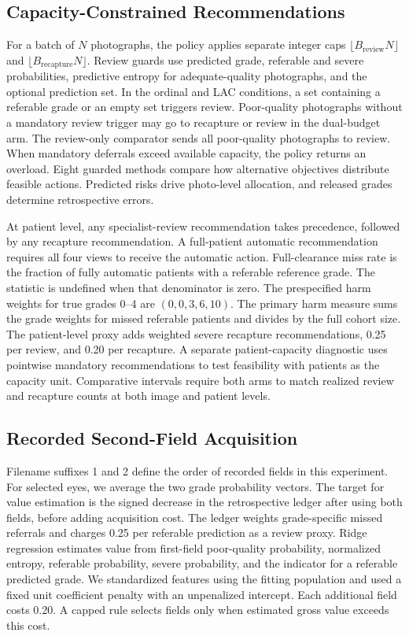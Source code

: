 \documentclass[conference]{IEEEtran}
\begin{document}
\subsection{Capacity-Constrained Recommendations}
For a batch of $N$ photographs, the policy applies separate integer caps
$\lfloor B_{\mathrm{review}}N\rfloor$ and
$\lfloor B_{\mathrm{recapture}}N\rfloor$. Review guards use predicted grade,
referable and severe probabilities, predictive entropy for adequate-quality
photographs, and the optional prediction set. In the ordinal and LAC
conditions, a set containing a referable grade or an empty set triggers
review. Poor-quality photographs without a mandatory review trigger may go to
recapture or review in the dual-budget arm. The review-only comparator sends
all poor-quality photographs to review. When mandatory deferrals exceed
available capacity, the policy returns an overload. Eight guarded methods
compare how alternative objectives distribute feasible actions. Predicted
risks drive photo-level allocation, and released grades determine retrospective
errors.

At patient level, any specialist-review recommendation takes precedence,
followed by any recapture recommendation. A full-patient automatic
recommendation requires all four views to receive the automatic action.
Full-clearance miss rate is the fraction of fully automatic patients with a
referable reference grade. The statistic is undefined when that denominator
is zero. The prespecified harm weights for true grades 0--4 are
$(0,0,3,6,10)$. The primary harm measure sums the grade weights for missed
referable patients and divides by the full cohort size. The patient-level
proxy adds weighted severe recapture recommendations, 0.25 per review, and
0.20 per recapture. A separate patient-capacity diagnostic uses pointwise
mandatory recommendations to test feasibility with patients as the capacity
unit. Comparative intervals require both arms to match realized review and
recapture counts at both image and patient levels.

\subsection{Recorded Second-Field Acquisition}
Filename suffixes 1 and 2 define the order of recorded fields in this
experiment. For selected eyes, we average the two grade probability vectors.
The target for value estimation is the signed decrease in the retrospective
ledger after using both fields, before adding acquisition cost. The ledger
weights grade-specific missed referrals and charges 0.25 per referable
prediction as a review proxy. Ridge regression estimates value from first-field
poor-quality probability, normalized entropy, referable probability, severe
probability, and the indicator for a referable predicted grade. We
standardized features using the fitting population and used a fixed unit
coefficient penalty with an unpenalized intercept. Each additional field
costs 0.20. A capped rule selects fields only when estimated gross value
exceeds this cost.
\end{document}
